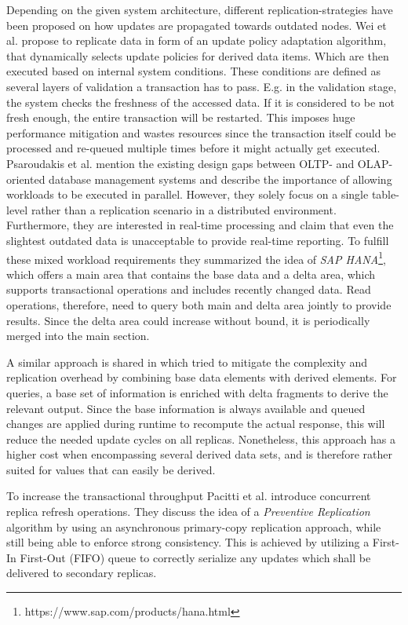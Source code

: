 Depending on the given system architecture, different replication-strategies have been proposed on how updates are propagated towards outdated nodes.
Wei et al. \cite{wei:2004} propose to replicate data in form of an update policy adaptation algorithm, that dynamically selects update policies
for derived data items. Which are then executed based on internal system conditions. These conditions are defined as several layers of validation a transaction has to pass.
E.g. in the validation stage, the system checks the freshness of the accessed data. If it is considered to be not fresh enough, the entire transaction will be restarted.
This imposes huge performance mitigation and wastes resources since the transaction itself could be processed and re-queued multiple times before it might actually get executed.\\
Psaroudakis et al. \cite{psaroudakis:2015} mention the existing design gaps between OLTP- and OLAP-oriented database management systems and describe the importance of 
allowing workloads to be executed in parallel. However, they solely focus on a single table-level rather than a replication scenario in a distributed 
environment. Furthermore, they are interested in real-time processing and claim that even the slightest outdated data is unacceptable to provide real-time reporting.
To fulfill these mixed workload requirements they summarized the idea of \emph{SAP HANA}\footnote{https://www.sap.com/products/hana.html}, which offers a main area that contains the base data and a delta area, 
which supports transactional operations and includes recently changed data. Read operations, therefore, need to query both main and delta area jointly to provide results. 
Since the delta area could increase without bound, it is periodically merged into the main section. 


A similar approach is shared in \cite{wei:2004} which tried to mitigate the complexity and replication overhead by combining base data elements with derived elements.
For queries, a base set of information is enriched with delta fragments to derive the relevant output.
Since the base information is always available and queued changes are applied during runtime to recompute 
the actual response, this will reduce the needed update cycles on all replicas. Nonetheless, this approach has a higher cost when encompassing several derived data sets, and 
is therefore rather suited for values that can easily be derived.


To increase the transactional throughput Pacitti et al. \cite{pacitti:2005} introduce concurrent replica refresh operations.
They discuss the idea of a \emph{Preventive Replication} algorithm by using an asynchronous primary-copy replication approach, while still being able to enforce
strong consistency. This is achieved by utilizing a First-In First-Out (FIFO) queue to correctly serialize any updates which shall be delivered to secondary replicas.

